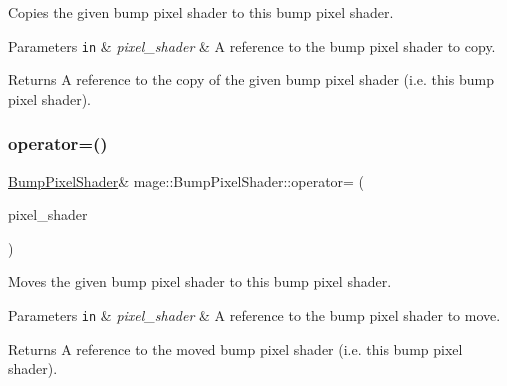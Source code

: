 Copies the given bump pixel shader to this bump pixel shader.


\begin{DoxyParams}[1]{Parameters}
\mbox{\tt in}  & {\em pixel\+\_\+shader} & A reference to the bump pixel shader to copy. \\
\hline
\end{DoxyParams}
\begin{DoxyReturn}{Returns}
A reference to the copy of the given bump pixel shader (i.\+e. this bump pixel shader). 
\end{DoxyReturn}
\hypertarget{classmage_1_1_bump_pixel_shader_acebedf6bcce2d9f764ac807bc9456ede}{}\label{classmage_1_1_bump_pixel_shader_acebedf6bcce2d9f764ac807bc9456ede} 
\subsubsection{\texorpdfstring{operator=()}{operator=()}\hspace{0.1cm}{\footnotesize\ttfamily [2/2]}}
{\footnotesize\ttfamily \hyperlink{classmage_1_1_bump_pixel_shader}{Bump\+Pixel\+Shader}\& mage\+::\+Bump\+Pixel\+Shader\+::operator= (\begin{DoxyParamCaption}\item[{\hyperlink{classmage_1_1_bump_pixel_shader}{Bump\+Pixel\+Shader} \&\&}]{pixel\+\_\+shader }\end{DoxyParamCaption})\hspace{0.3cm}{\ttfamily [delete]}}

Moves the given bump pixel shader to this bump pixel shader.


\begin{DoxyParams}[1]{Parameters}
\mbox{\tt in}  & {\em pixel\+\_\+shader} & A reference to the bump pixel shader to move. \\
\hline
\end{DoxyParams}
\begin{DoxyReturn}{Returns}
A reference to the moved bump pixel shader (i.\+e. this bump pixel shader). 
\end{DoxyReturn}
\hypertarget{classmage_1_1_bump_pixel_shader_aa365b87ca4860c58048ee1a119b4b668}{}\label{classmage_1_1_bump_pixel_shader_aa365b87ca4860c58048ee1a119b4b668} 
